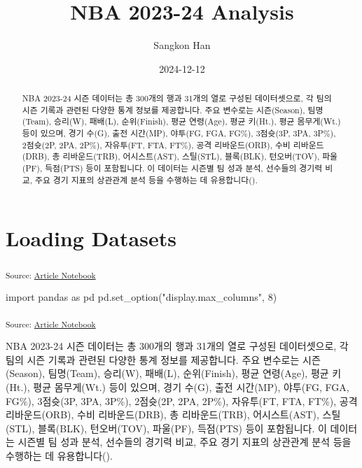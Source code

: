 \documentclass[
  a4paper,
  DIV=11,
  numbers=noendperiod]{scrreprt}
\title{NBA 2023-24 Analysis}
\author{Sangkon Han}
\date{2024-12-12}
\newenvironment{Shaded}{\begin{snugshade}}{\end{snugshade}}
\newcommand{\DecValTok}[1]{\textcolor[rgb]{0.68,0.00,0.00}{#1}}
\newcommand{\ImportTok}[1]{\textcolor[rgb]{0.00,0.46,0.62}{#1}}
\newcommand{\NormalTok}[1]{\textcolor[rgb]{0.00,0.23,0.31}{#1}}
\newcommand{\StringTok}[1]{\textcolor[rgb]{0.13,0.47,0.30}{#1}}
\renewcommand*\contentsname{Table of contents}
\newcommand\contentsname{Table of contents}
\begin{document}
\maketitle
\begin{abstract}
NBA 2023-24 시즌 데이터는 총 300개의 행과 31개의 열로 구성된
데이터셋으로, 각 팀의 시즌 기록과 관련된 다양한 통계 정보를 제공합니다.
주요 변수로는 시즌(Season), 팀명(Team), 승리(W), 패배(L), 순위(Finish),
평균 연령(Age), 평균 키(Ht.), 평균 몸무게(Wt.) 등이 있으며, 경기 수(G),
출전 시간(MP), 야투(FG, FGA, FG\%), 3점슛(3P, 3PA, 3P\%), 2점슛(2P, 2PA,
2P\%), 자유투(FT, FTA, FT\%), 공격 리바운드(ORB), 수비 리바운드(DRB), 총
리바운드(TRB), 어시스트(AST), 스틸(STL), 블록(BLK), 턴오버(TOV),
파울(PF), 득점(PTS) 등이 포함됩니다. 이 데이터는 시즌별 팀 성과 분석,
선수들의 경기력 비교, 주요 경기 지표의 상관관계 분석 등을 수행하는 데
유용합니다().
\end{abstract}

\renewcommand*\contentsname{Table of contents}
{
\hypersetup{linkcolor=}
\setcounter{tocdepth}{1}
\tableofcontents
}

\chapter{Loading Datasets}\label{loading-datasets}

\textsubscript{Source:
\href{https://sigmadream.github.io/practice-quarto/NBA_2023-24.ipynb.html}{Article
Notebook}}

\begin{Shaded}
\begin{Highlighting}[]
\ImportTok{import}\NormalTok{ pandas }\ImportTok{as}\NormalTok{ pd}
\NormalTok{pd.set\_option(}\StringTok{"display.max\_columns"}\NormalTok{, }\DecValTok{8}\NormalTok{)}
\end{Highlighting}
\end{Shaded}

\textsubscript{Source:
\href{https://sigmadream.github.io/practice-quarto/NBA_2023-24.ipynb.html}{Article
Notebook}}

NBA 2023-24 시즌 데이터는 총 300개의 행과 31개의 열로 구성된
데이터셋으로, 각 팀의 시즌 기록과 관련된 다양한 통계 정보를 제공합니다.
주요 변수로는 시즌(Season), 팀명(Team), 승리(W), 패배(L), 순위(Finish),
평균 연령(Age), 평균 키(Ht.), 평균 몸무게(Wt.) 등이 있으며, 경기 수(G),
출전 시간(MP), 야투(FG, FGA, FG\%), 3점슛(3P, 3PA, 3P\%), 2점슛(2P, 2PA,
2P\%), 자유투(FT, FTA, FT\%), 공격 리바운드(ORB), 수비 리바운드(DRB), 총
리바운드(TRB), 어시스트(AST), 스틸(STL), 블록(BLK), 턴오버(TOV),
파울(PF), 득점(PTS) 등이 포함됩니다. 이 데이터는 시즌별 팀 성과 분석,
선수들의 경기력 비교, 주요 경기 지표의 상관관계 분석 등을 수행하는 데
유용합니다().
\end{document}

